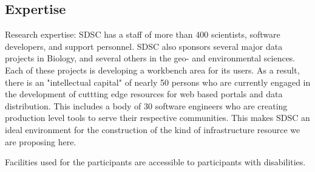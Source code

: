  

 

\subsection{Expertise}

Research expertise: SDSC has a staff of more than 400 scientists,
software developers, and support personnel. SDSC also sponsors several
major data projects in Biology, and several others in the geo- and
environmental sciences. Each of these projects is developing a
workbench area for its users. As a result, there is an "intellectual
capital" of nearly 50 persons who are currently engaged in the
development of cuttting edge resources for web based portals and data
distribution. This includes a body of 30 software engineers who are
creating production level tools to serve their respective communities.
This makes SDSC an ideal environment for the construction of the kind
of infrastructure resource we are proposing here.

 

Facilities used for the participants are accessible to participants
with disabilities.
